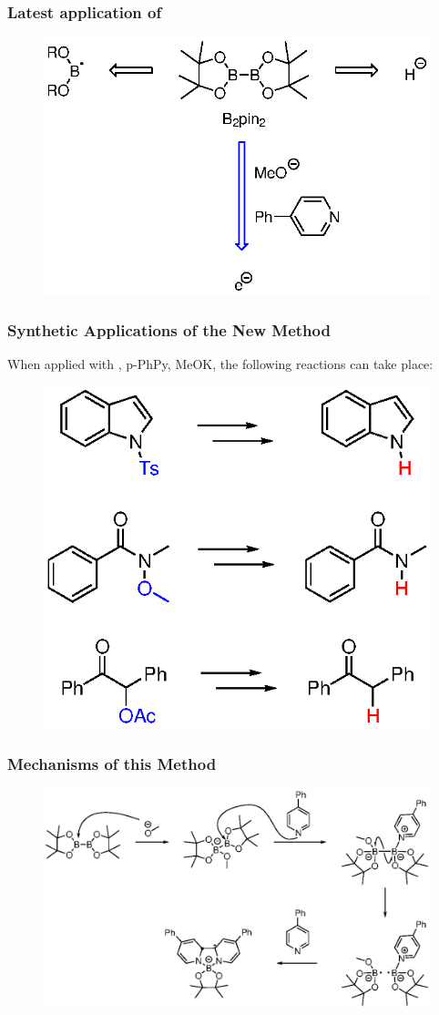 \begin{frame}
	\frametitle{Latest application of }
	\begin{figure}
		\centering
		\includegraphics[width=0.8\linewidth]{fig/b2pin2-intro}
		\label{fig:b2pin2-intro}
	\end{figure}
	
\end{frame}

\begin{frame}
	\frametitle{Synthetic Applications of the New Method}
	When applied with , p-PhPy, MeOK, the following reactions can take place:
	\begin{figure}
		\centering
		\includegraphics[width=0.44\linewidth]{fig/b2pin2-showcase}
		\label{fig:b2pin2-showcase}
	\end{figure}
	
\end{frame}

\begin{frame}
	\frametitle{Mechanisms of this Method}
	\begin{figure}
		\centering
		\includegraphics[width=0.8\linewidth]{fig/b2pin2mech}
		\label{fig:b2pin2mech}
	\end{figure}
	
\end{frame}